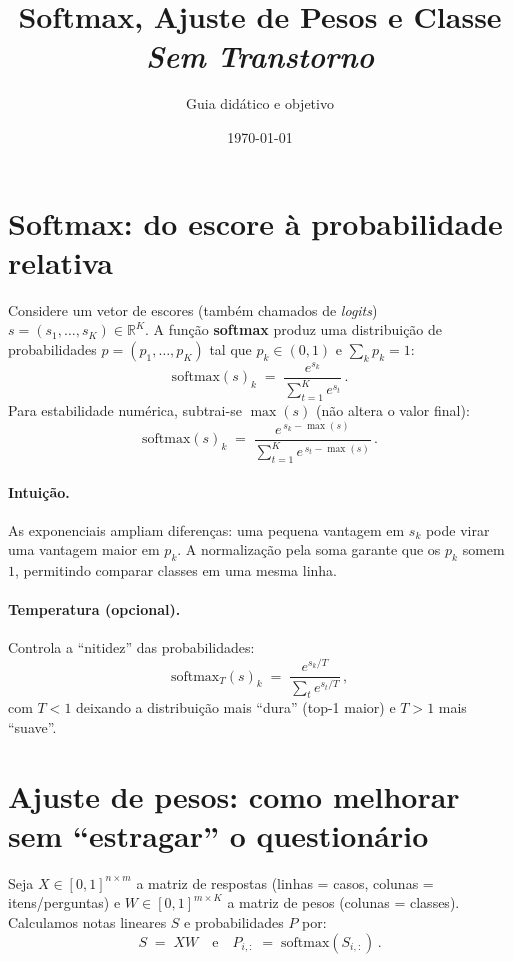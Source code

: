 \documentclass[11pt,a4paper]{article}
\title{\textbf{Softmax, Ajuste de Pesos e Classe \emph{Sem Transtorno}}}
\author{Guia didático e objetivo}
\date{\today}
\begin{document}
\maketitle

\section{Softmax: do escore à probabilidade relativa}
Considere um vetor de escores (também chamados de \emph{logits}) $s=(s_1,\ldots,s_K) \in \mathbb{R}^K$.
A função \textbf{softmax} produz uma distribuição de probabilidades $p=(p_1,\ldots,p_K)$ tal que $p_k \in (0,1)$ e $\sum_k p_k = 1$:
\begin{equation}
  \mathrm{softmax}(s)_k \;=\; \frac{e^{s_k}}{\sum_{t=1}^{K} e^{s_t}} \,.
\end{equation}
Para estabilidade numérica, subtrai-se $\max(s)$ (não altera o valor final):
\begin{equation}
  \mathrm{softmax}(s)_k \;=\; \frac{e^{\,s_k - \max(s)}}{\sum_{t=1}^{K} e^{\,s_t - \max(s)}} \,.
\end{equation}

\paragraph{Intuição.} As exponenciais ampliam diferenças: uma pequena vantagem em $s_k$ pode virar uma vantagem maior em $p_k$.
A normalização pela soma garante que os $p_k$ somem $1$, permitindo comparar classes em uma mesma linha.

\paragraph{Temperatura (opcional).} Controla a ``nitidez'' das probabilidades:
\begin{equation}
  \mathrm{softmax}_T(s)_k \;=\; \frac{e^{s_k/T}}{\sum_t e^{s_t/T}}\,,
\end{equation}
com $T<1$ deixando a distribuição mais ``dura'' (top-1 maior) e $T>1$ mais ``suave''.

\section{Ajuste de pesos: como melhorar sem ``estragar'' o questionário}
Seja $X \in [0,1]^{n \times m}$ a matriz de respostas (linhas = casos, colunas = itens/perguntas) e $W \in [0,1]^{m \times K}$ a matriz de pesos (colunas = classes).
Calculamos notas lineares $S$ e probabilidades $P$ por:
\begin{equation}
  S \;=\; XW \quad\text{e}\quad P_{i,:} \;=\; \mathrm{softmax}(S_{i,:}) \,.
\end{equation}
\end{document}
